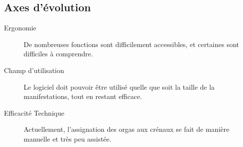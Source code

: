 \subsection{Axes d'évolution}
\begin{description}
 \item[Ergonomie] De nombreuses fonctions sont difficilement accessibles, et certaines sont difficiles à comprendre.
\item[Champ d'utilisation] Le logiciel doit pouvoir être utilisé quelle que soit la taille de la manifestations, tout en restant efficace.
\item[Efficacité Technique] Actuellement, l'assignation des orgas aux crénaux se fait de manière manuelle et très peu assistée.
\end{description}